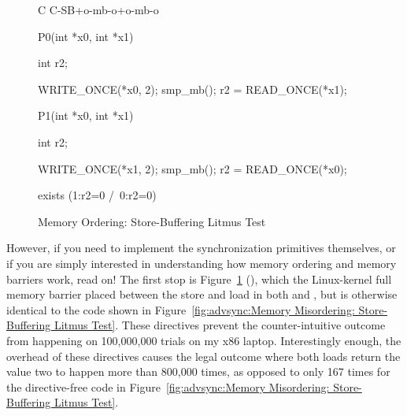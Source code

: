 \begin{figure}
{ \scriptsize
\begin{verbbox}[\LstLineNo]
C C-SB+o-mb-o+o-mb-o
{
}

P0(int *x0, int *x1)
{
  int r2;

  WRITE_ONCE(*x0, 2);
  smp_mb();
  r2 = READ_ONCE(*x1);
}


P1(int *x0, int *x1)
{
  int r2;

  WRITE_ONCE(*x1, 2);
  smp_mb();
  r2 = READ_ONCE(*x0);
}

exists (1:r2=0 /\ 0:r2=0)
\end{verbbox}
}
\centering
\theverbbox
\caption{Memory Ordering: Store-Buffering Litmus Test}
\label{fig:advsync:Memory Ordering: Store-Buffering Litmus Test}
\end{figure}

However, if you need to implement the synchronization primitives
themselves, or if you are simply interested in understanding how memory
ordering and memory barriers work, read on!
The first stop is
Figure~\ref{fig:advsync:Memory Ordering: Store-Buffering Litmus Test}
(),
which the  Linux-kernel full memory barrier placed between
the store and load in both  and , but is otherwise
identical to the code shown in
Figure~\ref{fig:advsync:Memory Misordering: Store-Buffering Litmus Test}.
These directives prevent the counter-intuitive outcome from happening
on 100,000,000 trials on my x86 laptop.
Interestingly enough, the overhead of these directives causes the
legal outcome where both loads return the value two to happen more
than 800,000 times, as opposed to only 167 times for the
directive-free code in
Figure~\ref{fig:advsync:Memory Misordering: Store-Buffering Litmus Test}.

